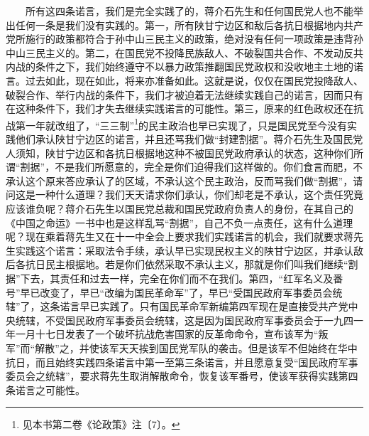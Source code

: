 \documentclass[cn,11pt,chinese]{elegantbook}
\begin{document}
　　所有这四条诺言，我们是完全实践了的，蒋介石先生和任何国民党人也不能举出任何一条是我们没有实践的。第一，所有陕甘宁边区和敌后各抗日根据地内共产党所施行的政策都符合于孙中山三民主义的政策，绝对没有任何一项政策是违背孙中山三民主义的。第二，在国民党不投降民族敌人、不破裂国共合作、不发动反共内战的条件之下，我们始终遵守不以暴力政策推翻国民党政权和没收地主土地的诺言。过去如此，现在如此，将来亦准备如此。这就是说，仅仅在国民党投降敌人、破裂合作、举行内战的条件下，我们才被迫着无法继续实践自己的诺言，因而只有在这种条件下，我们才失去继续实践诺言的可能性。第三，原来的红色政权还在抗战第一年就改组了，“三三制”\footnote[8]{ 见本书第二卷《论政策》注〔7〕。}的民主政治也早已实现了，只是国民党至今没有实践他们承认陕甘宁边区的诺言，并且还骂我们做“封建割据”。蒋介石先生及国民党人须知，陕甘宁边区和各抗日根据地这种不被国民党政府承认的状态，这种你们所谓“割据”，不是我们所愿意的，完全是你们迫得我们这样做的。你们食言而肥，不承认这个原来答应承认了的区域，不承认这个民主政治，反而骂我们做“割据”，请问这是一种什么道理？我们天天请求你们承认，你们却老是不承认，这个责任究竟应该谁负呢？蒋介石先生以国民党总裁和国民党政府负责人的身份，在其自己的《中国之命运》一书中也是这样乱骂“割据”，自己不负一点责任，这有什么道理呢？现在乘着蒋先生又在十一中全会上要求我们实践诺言的机会，我们就要求蒋先生实践这个诺言：采取法令手续，承认早已实现民权主义的陕甘宁边区，并承认敌后各抗日民主根据地。若是你们依然采取不承认主义，那就是你们叫我们继续“割据”下去，其责任和过去一样，完全在你们而不在我们。第四，“红军名义及番号”早已改变了，早已“改编为国民革命军”了，早已“受国民政府军事委员会统辖”了，这条诺言早已实践了。只有国民革命军新编第四军现在是直接受共产党中央统辖，不受国民政府军事委员会统辖，这是因为国民政府军事委员会于一九四一年一月十七日发表了一个破坏抗战危害国家的反革命命令，宣布该军为“叛军”而“解散”之，并使该军天天挨到国民党军队的袭击。但是该军不但始终在华中抗日，而且始终实践四条诺言中第一至第三条诺言，并且愿意复受“国民政府军事委员会之统辖”，要求蒋先生取消解散命令，恢复该军番号，使该军获得实践第四条诺言之可能性。\\
\end{document}

